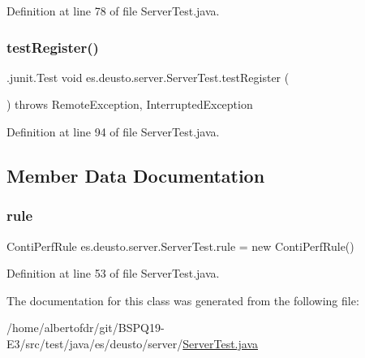 Definition at line 78 of file Server\+Test.\+java.

\mbox{\label{classes_1_1deusto_1_1server_1_1_server_test_adb4299be45a2652280186729967b6f78}} 
\subsubsection{\texorpdfstring{test\+Register()}{testRegister()}}
{\footnotesize\ttfamily .junit.\+Test void es.\+deusto.\+server.\+Server\+Test.\+test\+Register (\begin{DoxyParamCaption}{ }\end{DoxyParamCaption}) throws Remote\+Exception, Interrupted\+Exception}



Definition at line 94 of file Server\+Test.\+java.



\subsection{Member Data Documentation}
\mbox{\label{classes_1_1deusto_1_1server_1_1_server_test_ab2224d0a68cc9af1c1abded7e27f4241}} 
\subsubsection{\texorpdfstring{rule}{rule}}
{\footnotesize\ttfamily Conti\+Perf\+Rule es.\+deusto.\+server.\+Server\+Test.\+rule = new Conti\+Perf\+Rule()}



Definition at line 53 of file Server\+Test.\+java.



The documentation for this class was generated from the following file\+:\begin{DoxyCompactItemize}
\item 
/home/albertofdr/git/\+B\+S\+P\+Q19-\/\+E3/src/test/java/es/deusto/server/\hyperlink{_server_test_8java}{Server\+Test.\+java}\end{DoxyCompactItemize}

